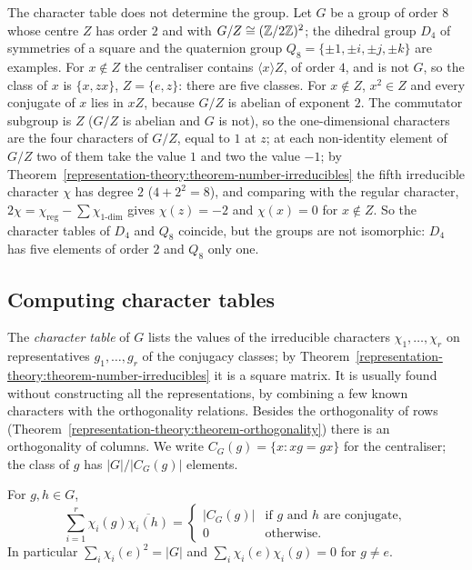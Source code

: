 \begin{counterexample}\label{representation-theory:counterexample-character-table}
The character table does not determine the group. Let $G$ be a group of order $8$ whose centre $Z$ has order $2$ and with $G/Z \cong (\mathbb{Z}/2\mathbb{Z})^2$; the dihedral group $D_4$ of symmetries of a square and the quaternion group
$Q_8 = \{\pm1, \pm i, \pm j, \pm k\}$ are examples. For $x \notin Z$ the centraliser contains $\langle x\rangle Z$, of order $4$, and is not $G$, so the class of $x$ is $\{x, zx\}$, $Z = \{e, z\}$: there are five classes. For $x \notin Z$, $x^2 \in Z$ and every conjugate of $x$ lies in $xZ$, because $G/Z$ is abelian of exponent $2$. The commutator subgroup is
$Z$ ($G/Z$ is abelian and $G$ is not), so the one-dimensional characters are the four characters of $G/Z$, equal to $1$ at $z$; at each non-identity element of $G/Z$ two of them take the value $1$ and two the value $-1$; by Theorem~\ref{representation-theory:theorem-number-irreducibles} the fifth irreducible character $\chi$ has
degree $2$ ($4 + 2^2 = 8$), and comparing with the regular character, $2\chi = \chi_{\mathrm{reg}} - \sum\chi_{1\text{-dim}}$ gives $\chi(z) = -2$ and $\chi(x) = 0$ for $x \notin Z$. So the character tables of $D_4$ and $Q_8$ coincide, but the
groups are not isomorphic: $D_4$ has five elements of order $2$ and $Q_8$ only one.
\end{counterexample}

\subsection{Computing character tables}\label{representation-theory:subsection-character-tables}

The \emph{character table} of $G$ lists the values of the irreducible characters $\chi_1, \ldots, \chi_r$ on representatives $g_1, \ldots, g_r$ of the conjugacy classes;
by Theorem~\ref{representation-theory:theorem-number-irreducibles} it is a square matrix. It is usually found without constructing all the representations, by
combining a few known characters with the orthogonality relations. Besides the orthogonality of rows (Theorem~\ref{representation-theory:theorem-orthogonality}) there
is an orthogonality of columns. We write $C_G(g) = \{x : xg = gx\}$ for the centraliser; the class of $g$ has $|G|/|C_G(g)|$ elements.

\begin{proposition}\label{representation-theory:proposition-column-orthogonality}
For $g, h \in G$,
\[
\sum_{i=1}^r\chi_i(g)\overline{\chi_i(h)} = \begin{cases}|C_G(g)| & \text{if } g \text{ and } h \text{ are conjugate},\\ 0 & \text{otherwise.}\end{cases}
\]
In particular $\sum_i\chi_i(e)^2 = |G|$ and $\sum_i\chi_i(e)\chi_i(g) = 0$ for $g \neq e$.
\end{proposition}

